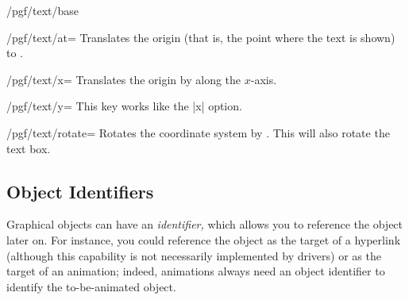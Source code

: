 \begin{command}{\pgftext{}}
\begin{key}{/pgf/text/base}
\begin{codeexample}[]
\end{codeexample}
\begin{codeexample}[]
\end{codeexample}
    \end{key}
    \begin{key}{/pgf/text/at=}
        Translates the origin (that is, the point where the text is shown) to
        .
\begin{codeexample}[]
\end{codeexample}
    \end{key}
    \begin{key}{/pgf/text/x=}
        Translates the origin by  along the $x$-axis.
\begin{codeexample}[]
\end{codeexample}
    \end{key}
    \begin{key}{/pgf/text/y=}
        This key works like the |x| option.
    \end{key}
    \begin{key}{/pgf/text/rotate=}
        Rotates the coordinate system by . This will also rotate
        the text box.
\begin{codeexample}[]
\end{codeexample}
    \end{key}
\end{command}


\subsection{Object Identifiers}

Graphical objects can have an \emph{identifier,} which allows you to reference
the object later on. For instance, you could reference the object as the target
of a hyperlink (although this capability is not necessarily implemented by
drivers) or as the target of an animation; indeed, animations always need an
object identifier to identify the to-be-animated object.

